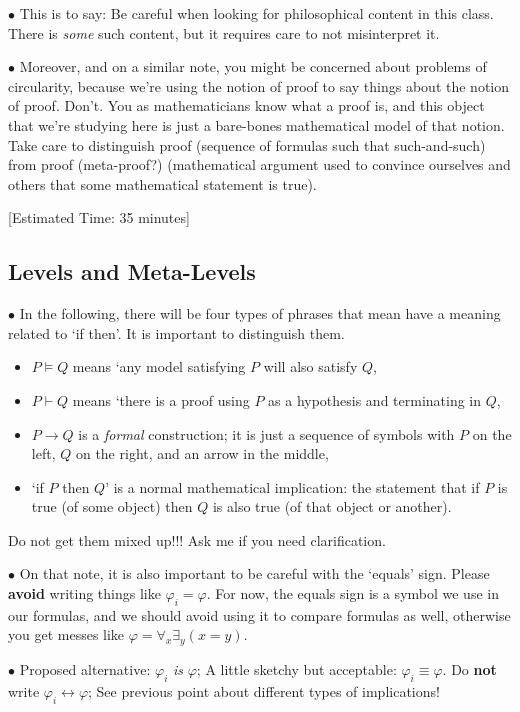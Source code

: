 \documentclass{article}
\newcommand\point[1]{\noindent \hspace{\labelsep} $\bullet$ #1 \smallskip}
\newcommand\timestamp[1]{\noindent \hspace{\labelsep} [Estimated Time: #1] \smallskip}
\begin{document}
\point{This is to say: Be careful when looking for philosophical content in this class. There is \emph{some} such content, but it requires care to not misinterpret it.}

\point{Moreover, and on a similar note, you might be concerned about problems of circularity, because we're using the notion of proof to say things about the notion of proof. Don't. You as mathematicians know what a proof is, and this object that we're studying here is just a bare-bones mathematical model of that notion. Take care to distinguish proof (sequence of formulas such that such-and-such) from proof (meta-proof?) (mathematical argument used to convince ourselves and others that some mathematical statement is true).}

\timestamp{35 minutes}

\subsection{Levels and Meta-Levels}

\point{In the following, there will be four types of phrases that mean have a meaning related to `if then'. It is important to distinguish them.
\begin{itemize}
\item $P \vDash Q$ means `any model satisfying $P$ will also satisfy $Q$,
\item $P \vdash Q$ means `there is a proof using $P$ as a hypothesis and terminating in $Q$,
\item $P \rightarrow Q$ is a \emph{formal} construction; it is just a sequence of symbols with $P$ on the left, $Q$ on the right, and an arrow in the middle,
\item `if $P$ then $Q$' is a normal mathematical implication: the statement that if $P$ is true (of some object) then $Q$ is also true (of that object or another).
\end{itemize}
Do not get them mixed up!!! Ask me if you need clarification.}

\point{On that note, it is also important to be careful with the `equals' sign. Please \textbf{avoid} writing things like $\varphi_i = \varphi$. For now, the equals sign is a symbol we use in our formulas, and we should avoid using it to compare formulas as well, otherwise you get messes like $\varphi = \forall_x \exists_y (x = y)$.}

\point{Proposed alternative: $\varphi_i$ \emph{is} $\varphi$; A little sketchy but acceptable: $\varphi_i \equiv \varphi$. Do \textbf{not} write $\varphi_i \leftrightarrow \varphi$; See previous point about different types of implications!}
\end{document}
